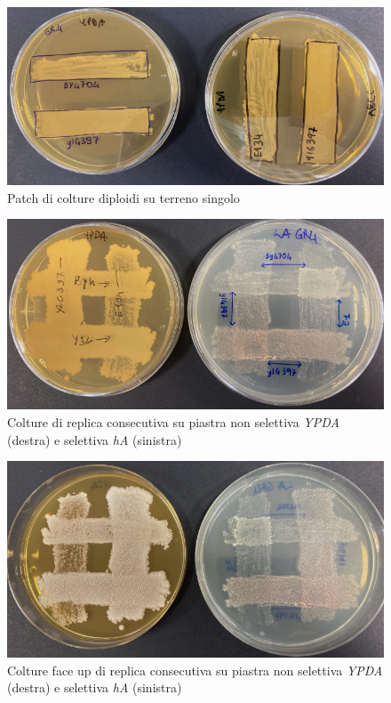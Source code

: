 		\begin{figure}[H]
			\centering
			\includegraphics[scale=0.4]{./Pics/SelezioneDiploidi/Giorno1-patch-terreno-ricco.png}
			\caption{Patch di colture diploidi su terreno singolo}
			\label{fig7}
		\end{figure}
	\begin{multicols}{2}
		\begin{figure}[H]
			\centering
		\includegraphics[scale=0.3]{./Pics/SelezioneDiploidi/Giorno2-selezione.png}
		\caption{Colture di replica consecutiva su piastra non selettiva \emph{YPDA} (destra) e selettiva \emph{hA} (sinistra)}
		\label{fig8}
	\end{figure}
	\columnbreak
		\begin{figure}[H]
			\centering
		\includegraphics[scale=0.275]{./Pics/SelezioneDiploidi/Giorno2-selezione-face-up.png}
		\caption{Colture face up di replica consecutiva su piastra non selettiva \emph{YPDA} (destra) e selettiva \emph{hA} (sinistra)}
		\label{fig9}
	\end{figure}
	\end{multicols}

